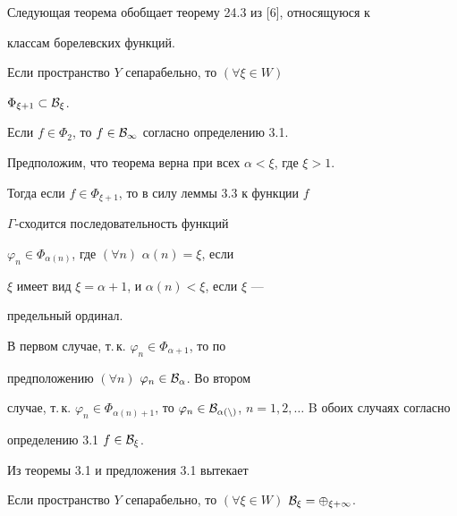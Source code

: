  


Следующая теорема обобщает теорему 24.3 из [6], относящуюся к 


классам борелевских функций. 


 


\begin{thms} 


Если пространство $Y$ сепарабельно, то $(\forall \xi\in W)$ 


$\Phi_{\xi+1}\subset\cal B_\xi$.


\end{thms} 


 


\begin{pf} 


Если $f\in\Phi_2$, то $f\in\cal B_1$ согласно определению 3.1. 


Предположим, что теорема верна при всех $\alpha<\xi$, где $\xi>1$. 


Тогда если $f\in\Phi_{\xi+1}$, то в силу леммы 3.3 к функции $f$ \ 


$\Gamma$-сходится последовательность функций 


$\varphi_n\in\Phi_{\alpha(n)}$, где $(\forall n)$ $\alpha(n)=\xi$, если 


$\xi$ имеет вид $\xi=\alpha+1$, и $\alpha(n)<\xi$, если $\xi$ --- 


предельный ординал. 


 


В первом случае, т.\,к. $\varphi_n\in\Phi_{\alpha+1}$, то по 


предположению $(\forall n)$ $\varphi_n\in\cal B_\alpha$. Во втором 


случае, т.\,к. $\varphi_n\in\Phi_{\alpha(n)+1}$, то $\varphi_n\in 


\cal B_{\alpha(n)}$, $n=1,2,\dotsc$ B обоих случаях согласно 


определению 3.1 $f\in\cal B_\xi$. 


\end{pf} 


 


Из теоремы 3.1 и предложения 3.1 вытекает 


 


\begin{cors} 


Если пространство $Y$ сепарабельно, то $(\forall \xi\in W)$ $\cal 


B_\xi=\Phi_{\xi+1}$. 


\end{cors} 



